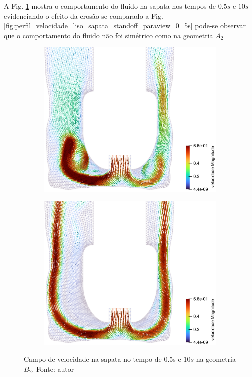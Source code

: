 A Fig. \ref{fig:perfil_velocidade_rugoso_sapata_standoff_paraview_0.5s} mostra o comportamento do fluido na sapata nos tempos de $0.5s$ e $10s$ evidenciando o efeito da erosão se comparado a Fig. \ref{fig:perfil_velocidade_liso_sapata_standoff_paraview_0_5s} pode-se observar que o comportamento do fluido não foi simétrico como na geometria $A_2$
    \begin{figure}[H]
        \centering
        \begin{subfigure}[b]{0.42\linewidth}
            \includegraphics[width=\linewidth]{img/perfil_vel/rugoso/perfil_de_vel_sapata_standoff_paraview_0_5s.eps}
        \end{subfigure}
        \begin{subfigure}[b]{0.42\linewidth}
            \includegraphics[width=\linewidth]{img/perfil_vel/rugoso/perfil_de_vel_sapata_standoff_paraview_10s.eps}
        \end{subfigure}
    	
    	\caption{Campo de velocidade na sapata no tempo de 0.5s e $10s$ na geometria $B_2$. Fonte: autor}
    	\label{fig:perfil_velocidade_rugoso_sapata_standoff_paraview_0.5s}
    \end{figure}
    
